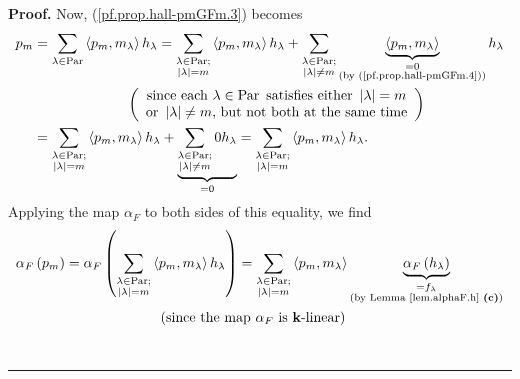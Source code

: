 \documentclass[numbers=enddot,12pt,final,onecolumn,notitlepage]{scrartcl}%
\theoremstyle{definition}
\newenvironment{proof}[1][Proof]{\noindent\textbf{#1.} }{\ \rule{0.5em}{0.5em}}
\let\sumnonlimits\sum
\renewcommand{\sum}{\sumnonlimits\limits}
\newenvironment{verlong}{}{}
\begin{document}
\begin{verlong}
\begin{proof}
Now, (\ref{pf.prop.hall-pmGFm.3}) becomes%
\begin{align*}
p_{m}  &  =\sum_{\lambda\in\operatorname*{Par}}\left\langle p_{m},m_{\lambda
}\right\rangle h_{\lambda}=\sum_{\substack{\lambda\in\operatorname*{Par}%
;\\\left\vert \lambda\right\vert =m}}\left\langle p_{m},m_{\lambda
}\right\rangle h_{\lambda}+\sum_{\substack{\lambda\in\operatorname*{Par}%
;\\\left\vert \lambda\right\vert \neq m}}\underbrace{\left\langle
p_{m},m_{\lambda}\right\rangle }_{\substack{=0\\\text{(by
(\ref{pf.prop.hall-pmGFm.4}))}}}h_{\lambda}\\
&  \ \ \ \ \ \ \ \ \ \ \ \ \ \ \ \ \ \ \ \ \left(
\begin{array}
[c]{c}%
\text{since each }\lambda\in\operatorname*{Par}\text{ satisfies either
}\left\vert \lambda\right\vert =m\\
\text{or }\left\vert \lambda\right\vert \neq m\text{, but not both at the same
time}%
\end{array}
\right) \\
&  =\sum_{\substack{\lambda\in\operatorname*{Par};\\\left\vert \lambda
\right\vert =m}}\left\langle p_{m},m_{\lambda}\right\rangle h_{\lambda
}+\underbrace{\sum_{\substack{\lambda\in\operatorname*{Par};\\\left\vert
\lambda\right\vert \neq m}}0h_{\lambda}}_{=0}=\sum_{\substack{\lambda
\in\operatorname*{Par};\\\left\vert \lambda\right\vert =m}}\left\langle
p_{m},m_{\lambda}\right\rangle h_{\lambda}.
\end{align*}
Applying the map $\alpha_{F}$ to both sides of this equality, we find%
\begin{align*}
\alpha_{F}\left(  p_{m}\right)   &  =\alpha_{F}\left(  \sum_{\substack{\lambda
\in\operatorname*{Par};\\\left\vert \lambda\right\vert =m}}\left\langle
p_{m},m_{\lambda}\right\rangle h_{\lambda}\right)  =\sum_{\substack{\lambda
\in\operatorname*{Par};\\\left\vert \lambda\right\vert =m}}\left\langle
p_{m},m_{\lambda}\right\rangle \underbrace{\alpha_{F}\left(  h_{\lambda
}\right)  }_{\substack{=f_{\lambda}\\\text{(by Lemma \ref{lem.alphaF.h}
\textbf{(c)})}}}\\
&  \ \ \ \ \ \ \ \ \ \ \ \ \ \ \ \ \ \ \ \ \left(  \text{since the map }%
\alpha_{F}\text{ is }\mathbf{k}\text{-linear}\right) \\

\end{align*}
\end{proof}
\end{verlong}
\end{document}
